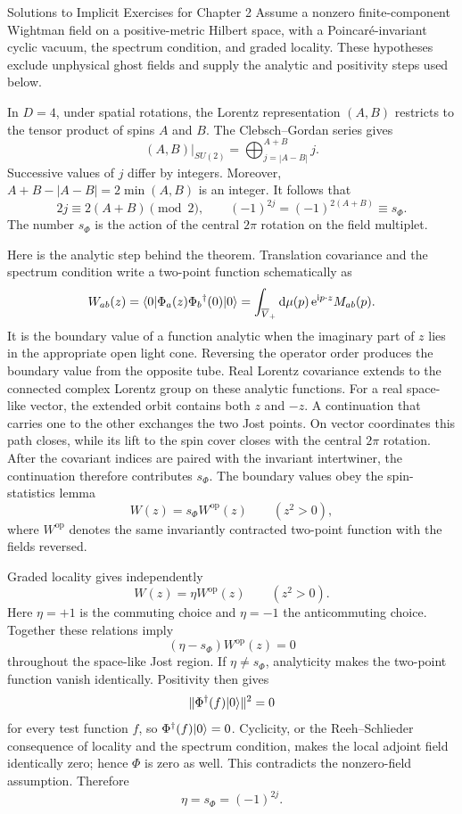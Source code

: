 \begin{bankssolutions}{Solutions to Implicit Exercises for Chapter 2}
Assume a nonzero finite-component Wightman field on a positive-metric Hilbert
space, with a Poincar\'e-invariant cyclic vacuum, the spectrum condition, and
graded locality. These hypotheses exclude unphysical ghost fields and supply
the analytic and positivity steps used below.

In $D=4$, under spatial rotations, the Lorentz representation $(A,B)$ restricts to the
tensor product of spins $A$ and $B$. The Clebsch--Gordan series gives
\[
  (A,B)\big|_{SU(2)}
  =\bigoplus_{j=|A-B|}^{A+B}j.
\]
Successive values of $j$ differ by integers. Moreover,
$A+B-|A-B|=2\min(A,B)$ is an integer. It follows that
\[
  2j\equiv2(A+B)\pmod2,
  \qquad (-1)^{2j}=(-1)^{2(A+B)}\equiv s_\Phi.
\]
The number $s_\Phi$ is the action of the central $2\pi$ rotation on the field
multiplet.

Here is the analytic step behind the theorem. Translation covariance and the
spectrum condition write a two-point function schematically as
\[
  W_{ab}(z)=\langle 0\rvert\Phi_a(z)\Phi_b{}^\dagger(0)\lvert 0\rangle
  =\int_{\overline V_+}\mathop{}\!\mathrm{d}\mu(p)\,
    \mathrm{e}^{\mathrm{i} p\mathbin{\cdot}z}M_{ab}(p).
\]
It is the boundary value of a function analytic when the imaginary part of
$z$ lies in the appropriate open light cone. Reversing the operator order
produces the boundary value from the opposite tube. Real Lorentz covariance
extends to the connected complex Lorentz group on these analytic functions.
For a real space-like vector, the extended orbit contains both $z$ and $-z$.
A continuation that carries one to the other exchanges the two Jost points.
On vector coordinates this path closes, while its lift to the spin cover closes
with the central $2\pi$ rotation. After the covariant indices are paired with
the invariant intertwiner, the continuation therefore contributes $s_\Phi$.
The boundary values obey the spin-statistics lemma
\[
  W(z)=s_\Phi W^{\mathrm{op}}(z)
  \qquad (z^2>0),
\]
where $W^{\mathrm{op}}$ denotes the same invariantly contracted two-point
function with the fields reversed.

Graded locality gives independently
\[
  W(z)=\eta W^{\mathrm{op}}(z)
  \qquad (z^2>0).
\]
Here $\eta=+1$ is the commuting choice and $\eta=-1$ the anticommuting choice.
Together these relations imply
\[
  (\eta-s_\Phi)W^{\mathrm{op}}(z)=0
\]
throughout the space-like Jost region. If $\eta\ne s_\Phi$, analyticity makes
the two-point function vanish identically. Positivity then gives
\[
  \lVert\Phi^\dagger(f)\lvert 0\rangle\rVert^2=0
\]
for every test function $f$, so $\Phi^\dagger(f)\lvert 0\rangle=0$. Cyclicity, or the
Reeh--Schlieder consequence of locality and the spectrum condition, makes the
local adjoint field identically zero; hence $\Phi$ is zero as well. This
contradicts the nonzero-field assumption. Therefore
\[
  \eta=s_\Phi=(-1)^{2j}.
\]


\end{bankssolutions}

